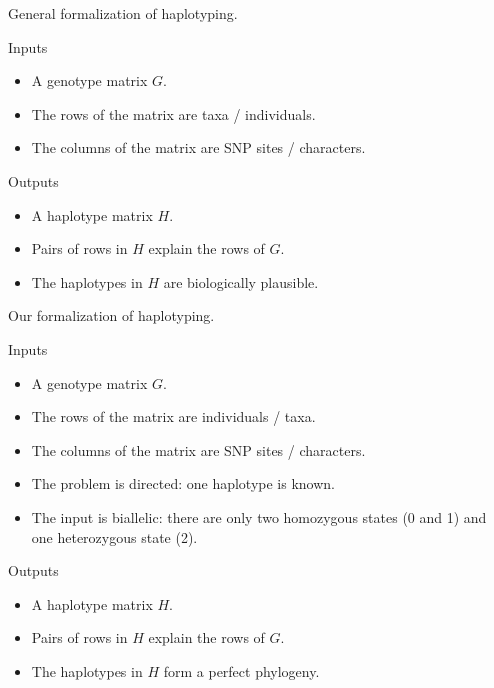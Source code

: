 \documentclass[aspectratio=169]{beamer}
\begin{document}
\begin{frame}[t]{General formalization of haplotyping.}
  \begin{block}{Inputs}
    \begin{itemize}
    \item A \alert{genotype matrix} $G$.
    \item The \alert{rows} of the matrix are \alert{taxa / individuals}.
    \item The \alert{columns} of the matrix are \alert{SNP sites /
        characters}. 
    \end{itemize}
  \end{block}
  \begin{block}{Outputs}
    \begin{itemize}
    \item A \alert{haplotype matrix} $H$.
    \item Pairs of rows in $H$ \alert{explain} the rows of $G$.
    \item The haplotypes in $H$ are \alert{biologically plausible}. 
    \end{itemize}
  \end{block}
\end{frame}


\begin{frame}[t]{Our formalization of haplotyping.}
  \begin{block}{Inputs}
    \begin{itemize}
    \item A genotype matrix $G$.
    \item The rows of the matrix are individuals / taxa.
    \item The columns of the matrix are SNP sites / characters.
    \item<alert@1->
      The problem is directed: one haplotype is known.
    \item<alert@1->
      The input is biallelic: there are only two homozygous
      states (0 and 1) and one heterozygous state (2).
    \end{itemize}
  \end{block}
  \begin{block}{Outputs}
    \begin{itemize}
    \item A haplotype matrix $H$.
    \item Pairs of rows in $H$ explain the rows of $G$.
    \item<alert@1> The haplotypes in $H$ form a perfect phylogeny.
    \end{itemize}
  \end{block}
\end{frame}
\end{document}
